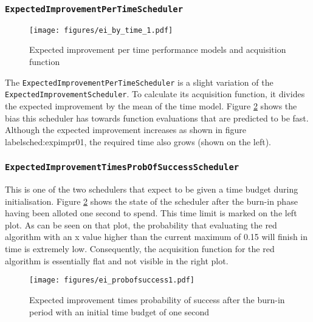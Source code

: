 \documentclass[a4paper,12pt,twoside,openright]{report}
\begin{document}
\subsubsection{\texttt{ExpectedImprovementPerTimeScheduler}}
\begin{figure}
\centering
  \texttt{[image: figures/ei\_by\_time\_1.pdf]}
  \caption{Expected improvement per time performance models and acquisition function}
  \label{sched:expimprpertime01}
\end{figure}

The \texttt{ExpectedImprovementPerTimeScheduler} is a slight variation of the \texttt{ExpectedImprovementScheduler}. To calculate its acquisition function, it divides the expected improvement by the mean of the time model. Figure \ref{sched:expimprpertime01} shows the bias this scheduler has towards function evaluations that are predicted to be fast. Although the expected improvement increases as shown in figure label{sched:expimpr01}, the required time also grows (shown on the left).

\subsubsection{\texttt{ExpectedImprovementTimesProbOfSuccessScheduler}}

This is one of the two schedulers that expect to be given a time budget during initialisation. Figure \ref{sched:expimprpertime01} shows the state of the scheduler after the burn-in phase having been alloted one second to spend. This time limit is marked on the left plot. As can be seen on that plot, the probability that evaluating the red algorithm with an x value higher than the current maximum of 0.15 will finish in time is extremely low. Consequently, the acquisition function for the red algorithm is essentially flat and not visible in the right plot.

\begin{figure}
\centering
  \texttt{[image: figures/ei\_probofsuccess1.pdf]}
  \caption{Expected improvement times probability of success after the burn-in period with an initial time budget of one second}
  \label{sched:expimprpertime01}
\end{figure}
\end{document}
